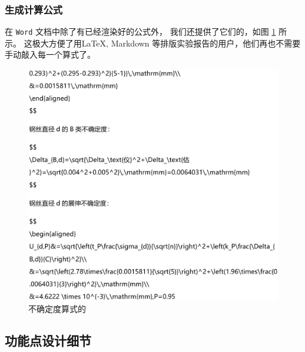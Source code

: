 \subsubsection*{生成计算公式}

在 \verb|Word| 文档中除了有已经渲染好的公式外，
我们还提供了它们的，如图 \ref{fig:latex} 所示。
这极大方便了用\LaTeX, Markdown 等排版实验报告的用户，他们再也不需要手动敲入每一个算式了。

\begin{figure}[htbp]
  \centering
  \includegraphics[width=\columnwidth]{figure/latex.png}
  \caption{不确定度算式的}
  \label{fig:latex}
\end{figure}

\subsection{功能点设计细节}
